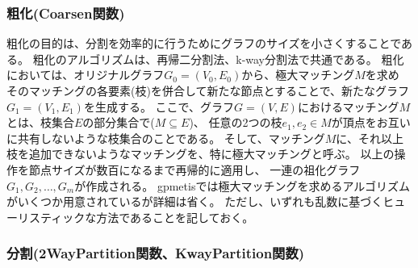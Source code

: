\subsubsection{粗化(Coarsen関数)}
粗化の目的は、分割を効率的に行うためにグラフのサイズを小さくすることである。
粗化のアルゴリズムは、再帰二分割法、k-way分割法で共通である。
粗化においては、オリジナルグラフ$G_0=(V_0,E_0)$から、極大マッチング$M$を求め%
そのマッチングの各要素(枝)を併合して新たな節点とすることで、新たなグラフ$G_1=(V_1,E_1)$を生成する。
ここで、グラフ$G=(V,E)$におけるマッチング$M$とは、枝集合$E$の部分集合で($M \subseteq E$)、
任意の2つの枝$e_1,e_2 \in M$が頂点をお互いに共有しないような枝集合のことである。
そして、マッチング$M$に、それ以上枝を追加できないようなマッチングを、特に極大マッチングと呼ぶ。
以上の操作を節点サイズが数百になるまで再帰的に適用し、
一連の祖化グラフ$G_1,G_2,\dots,G_m$が作成される。
gpmetisでは極大マッチングを求めるアルゴリズムがいくつか用意されているが詳細は省く。
ただし、いずれも乱数に基づくヒューリスティックな方法であることを記しておく。



\subsubsection{分割(2WayPartition関数、KwayPartition関数)}


